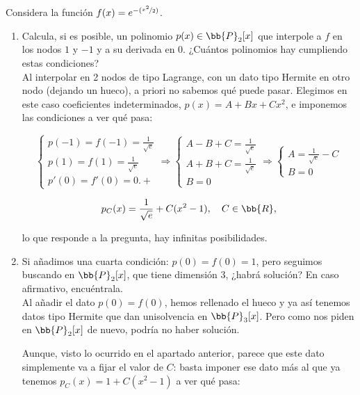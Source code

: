 \documentclass[12pt]{article}
\begin{document}
	\begin{ejercicio}[2 puntos]
		Considera la función $f(x) = e^{-(\nicefrac{x^2}{2})}$. 
		\begin{enumerate}[label=\alph*)]
			\item Calcula, si es posible, un polinomio $p(x) \in \bb{P}_2[x]$ que interpole a $f$ en los nodos $1$ y $-1$ y a su derivada en $0$. ¿Cuántos polinomios hay cumpliendo estas condiciones? \\
			
			Al interpolar en 2 nodos de tipo Lagrange, con un dato tipo Hermite en otro nodo (dejando un hueco), a priori no sabemos qué puede pasar. Elegimos en este caso coeficientes indeterminados, 
			$\boxed{p(x) = A + Bx + Cx^2}$, e imponemos las condiciones a ver qué pasa:
			
			$$
			\begin{cases}
				p(-1) = f(-1) = \frac{1}{\sqrt{e}} \\
				p(1) = f(1) = \frac{1}{\sqrt{e}} \\
				p'(0) = f'(0) = 0.+
			\end{cases} \Rightarrow
			\begin{cases}
				A-B+C = \frac{1}{\sqrt{e}} \\
				A+B+C= \frac{1}{\sqrt{e}} \\
				B= 0
			\end{cases} \Rightarrow
			\begin{cases}
				A = \frac{1}{\sqrt{e}} -C \\
				B= 0
			\end{cases}
			$$
			
			$$ p_C(x)=\frac{1}{\sqrt{e}}+C(x^2-1), \quad C \in \bb{R}, $$
			
			lo que responde a la pregunta, hay infinitas posibilidades.
			
			\item Si añadimos una cuarta condición: $p(0) = f(0) = 1$, pero seguimos buscando en $\bb{P}_2[x]$, que tiene dimensión 3, ¿habrá solución? En caso afirmativo, encuéntrala. \\
			
			Al añadir el dato $p(0) = f(0)$, hemos rellenado el hueco y ya así tenemos datos tipo Hermite que dan unisolvencia en $\bb{P}_3[x]$. Pero como nos piden en $\bb{P}_2[x]$ de nuevo, podría no haber solución. 
			
			Aunque, visto lo ocurrido en el apartado anterior, parece que este dato simplemente va a fijar el valor de $C$: basta imponer ese dato más al que ya tenemos $p_C(x) = 1 + C(x^2 - 1)$ a ver qué pasa:
			

\end{enumerate}
\end{ejercicio}
\end{document}
